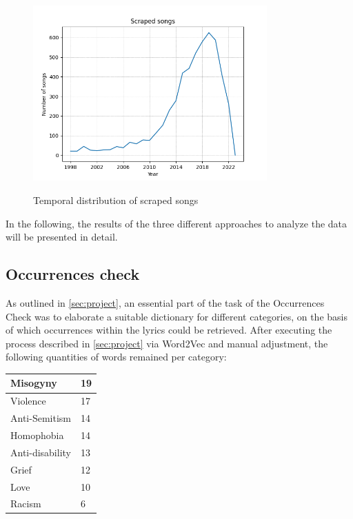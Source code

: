 \begin{figure}[!htb]
    \centering
    \includegraphics[width=0.8\textwidth]{figures/number_of_songs.png}
    \label{fig:number_songs}
    \caption{Temporal distribution of scraped songs}
\end{figure}

In the following, the results of the three different approaches to analyze the data will be presented in detail.

\subsection*{Occurrences check}

As outlined in \autoref*{sec:project}, an essential part of the task of the Occurrences Check was to elaborate a suitable dictionary for different categories, on the basis of which occurrences within the lyrics could be retrieved. After executing the process described in \autoref{sec:project} via Word2Vec and manual adjustment, the following quantities of words remained per category:

\begin{table}[!hbt]
    \centering
    \begin{tabular}{|l|l|}
    \hline
    Misogyny        & 19 \\ \hline
    Violence        & 17 \\ \hline
    Anti-Semitism   & 14 \\ \hline
    Homophobia      & 14 \\ \hline
    Anti-disability & 13 \\ \hline
    Grief           & 12 \\ \hline
    Love            & 10 \\ \hline
    Racism          & 6  \\ \hline
    \end{tabular}
\end{table}

